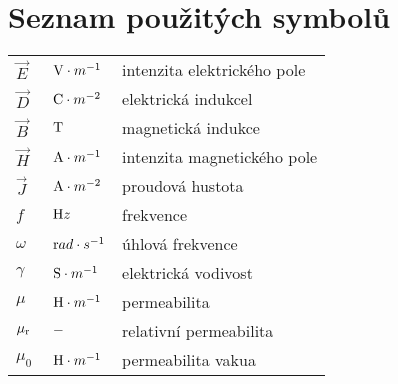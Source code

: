 \chapter*{Seznam použitých symbolů}
\begin{tabular}{lll}
	$\vec{E}$ & $\mathrm{\ V}\cdot m^{-1}$ & intenzita elektrického pole\\
	$\vec{D}$ & $\mathrm{\ C}\cdot m^{-2}$ & elektrická indukcel\\
	$\vec{B}$ & $\mathrm{\ T}$ & magnetická indukce\\
	$\vec{H}$ & $\mathrm{\ A}\cdot m^{-1}$ & intenzita magnetického pole\\
	$\vec{J}$ & $\mathrm{\ A}\cdot m^{-2}$ & proudová hustota\\	
	$f$ & $\mathrm{\ H}z$ & frekvence\\
	$\omega$ & $\mathrm{\ r}ad\cdot s^{-1}$ & úhlová frekvence\\
	$\gamma$ & $\mathrm{\ S}\cdot m^{-1}$ & elektrická vodivost\\
	$\mu$ & $\mathrm{\ H}\cdot m^{-1}$ & permeabilita\\
	$\mu_{\rm{r}}$ & $\mathrm{\ -}$ & relativní permeabilita\\
	$\mu_0$ & $\mathrm{\ H}\cdot m^{-1}$ & permeabilita vakua\\
\end{tabular}